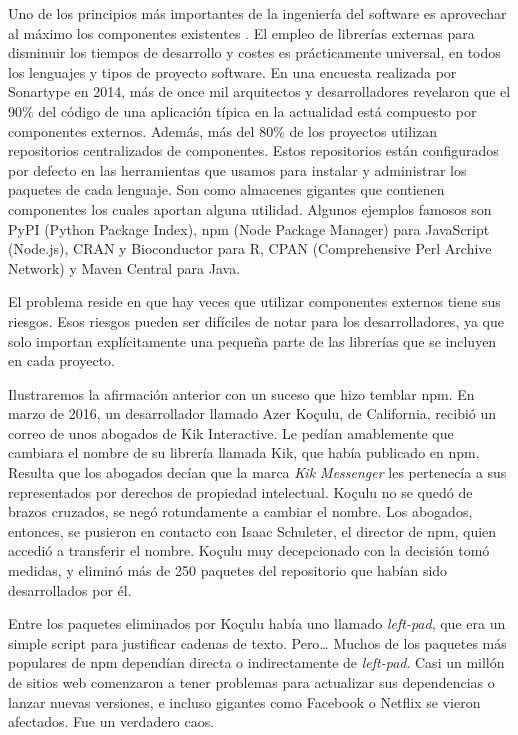 

Uno de los principios más importantes de la ingeniería del software es aprovechar al máximo los componentes existentes \cite{sametinger1997software}.
El empleo de librerías externas para disminuir los tiempos de desarrollo y costes es prácticamente universal,
en todos los lenguajes y tipos de proyecto software. En una encuesta realizada por Sonartype en 2014, más de once mil arquitectos y
desarrolladores revelaron que el 90\% del código de una aplicación típica en la actualidad está compuesto por componentes externos.
Además, más del 80\% de los proyectos utilizan repositorios centralizados de componentes.
Estos repositorios están configurados por defecto en las herramientas que usamos para instalar y administrar los paquetes de cada lenguaje.
Son como almacenes gigantes que contienen componentes los cuales aportan alguna utilidad.
Algunos ejemplos famosos son PyPI (Python Package Index), npm (Node Package Manager) para JavaScript (Node.js),
CRAN y Bioconductor para R, CPAN (Comprehensive Perl Archive Network) y Maven Central para Java.


El problema reside en que hay veces que utilizar componentes externos tiene sus riesgos. Esos riesgos pueden ser difíciles de 
notar para los desarrolladores, ya que solo importan explícitamente una pequeña parte de las librerías que se incluyen en cada proyecto.


Ilustraremos la afirmación anterior con un suceso que hizo temblar npm.
En marzo de 2016, un desarrollador llamado Azer Koçulu, de California, recibió un correo de unos abogados de Kik Interactive.
Le pedían amablemente que cambiara el nombre de su librería llamada Kik, que había publicado en npm.
Resulta que los abogados decían que la marca \textit{Kik Messenger} les pertenecía a sus representados \cite{BoldiPaolo2019} por derechos 
de propiedad intelectual.
Koçulu no se quedó de brazos cruzados, se negó rotundamente a cambiar el nombre.
Los abogados, entonces, se pusieron en contacto con Isaac Schuleter, el director de npm, quien accedió a transferir el nombre.
Koçulu muy decepcionado con la decisión tomó medidas, y eliminó más de 250 paquetes del repositorio que habían sido desarrollados por él.


Entre los paquetes eliminados por Koçulu había uno llamado \textit{left-pad},
que era un simple script para justificar cadenas de texto. Pero… Muchos de los paquetes más populares de npm dependían directa
o indirectamente de \textit{left-pad}. Casi un millón de sitios web comenzaron a tener problemas para actualizar sus dependencias o
lanzar nuevas versiones, e incluso gigantes como Facebook o Netflix se vieron afectados. Fue un verdadero caos.


